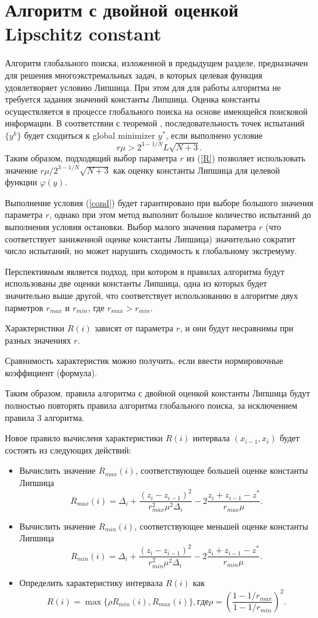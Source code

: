 \documentclass[runningheads]{llncs}
\begin{document}
\section{Алгоритм с двойной оценкой Lipschitz constant}

Алгоритм глобального поиска, изложенной в предыдущем разделе, предназначен для решения многоэкстремальных задач, в которых целевая функция удовлетворяет условию Липшица. При этом для для работы алгоритма не требуется задания  значений константы Липшица. Оценка константы осуществляется в процессе глобального поиска на основе имеющейся поисковой информации. 
В соответствии с теоремой \cite{Strongin2000}, последовательность точек испытаний $\{y^k\}$ будет сходиться к global minimizer $y^*$, если выполнено условие  
\begin{equation}\label{cond}
r\mu > 2^{3-1/N}L\sqrt{N+3}.
\end{equation}
Таким образом, подходящий выбор параметра $r$ из (\ref{R}) позволяет использовать значение $r\mu / 2^{3-1/N}\sqrt{N+3}$ как оценку константы Липшица для целевой функции $\varphi(y)$.


Выполнение условия (\ref{cond}) будет гарантировано при выборе большого значения параметра $r$, однако при этом метод выполнит большое количество испытаний до выполнения условия остановки.
Выбор малого значения параметра $r$ (что соответствует заниженной оценке константы Липшица) значительно сократит число испытаний, но может нарушить сходимость к глобальному экстремуму.

Перспективным является подход, при котором в правилах алгоритма будут использованы две оценки константы Липшица, одна из которых будет значительно выше другой, что соответствует использованию в алгоритме двух парметров $r_{max}$ и $r_{min}$, где $r_{max} > r_{min}$.


Характеристики $R(i)$ зависят от параметра $r$, и они будут несравнимы при разных значениях $r$.

Сравнимость характеристик можно получить, если ввести нормировочные коэффициент (формула).

Таким образом, правила алгоритма с двойной оценкой константы Липшица будут полностью повторять правила алгоритма глобального поиска, за исключением правила 3 алгоритма.

Новое правило вычисленя характеристики $R(i)$ интервала $(x_{i-1}, x_i)$ будет состоять из следующих действий:
\begin{itemize}
\item
Вычислить значение $R_{max}(i)$, соответствующее большей оценке константы Липшица
\[
R_{max}(i)=\Delta_i+\frac{(z_i-z_{i-1})^2}{r_{max}^2\mu^2\Delta_i}-2\frac{z_i+z_{i-1}-z^*}{r_{max}\mu}.
\]
\item
Вычислить значение $R_{min}(i)$, соответствующее меньшей оценке константы Липшица
\[
R_{min}(i)=\Delta_i+\frac{(z_i-z_{i-1})^2}{r_{min}^2\mu^2\Delta_i}-2\frac{z_i+z_{i-1}-z^*}{r_{min}\mu}.
\]
\item
Определить характеристику интервала $R(i)$ как
\[
R(i) = \max\{\rho R_{min}(i),R_{max}(i)\}, где \rho = \left(\frac{1-1/r_{max}}{1-1/r_{min}}\right)^2.
\]
\end{itemize}
\end{document}
